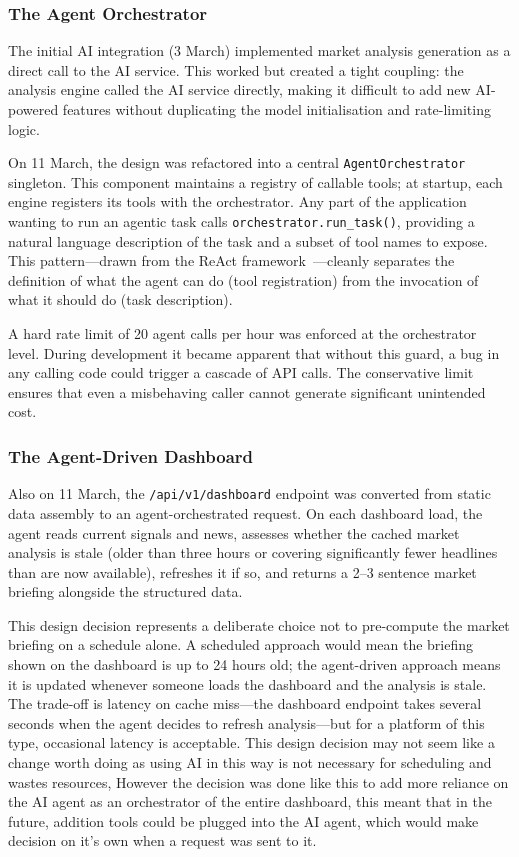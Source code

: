 \documentclass[12pt,a4paper]{article}
\begin{document}
\subsubsection*{The Agent Orchestrator}

The initial AI integration (3 March) implemented market analysis generation as a direct call to the AI service. This worked but created a tight coupling: the analysis engine called the AI service directly, making it difficult to add new AI-powered features without duplicating the model initialisation and rate-limiting logic.

On 11 March, the design was refactored into a central \texttt{AgentOrchestrator} singleton. This component maintains a registry of callable tools; at startup, each engine registers its tools with the orchestrator. Any part of the application wanting to run an agentic task calls \texttt{orchestrator.run\_task()}, providing a natural language description of the task and a subset of tool names to expose. This pattern---drawn from the ReAct framework~\cite{yao2022}---cleanly separates the definition of what the agent can do (tool registration) from the invocation of what it should do (task description).

A hard rate limit of 20 agent calls per hour was enforced at the orchestrator level. During development it became apparent that without this guard, a bug in any calling code could trigger a cascade of API calls. The conservative limit ensures that even a misbehaving caller cannot generate significant unintended cost.

\subsubsection*{The Agent-Driven Dashboard}

Also on 11 March, the \texttt{/api/v1/dashboard} endpoint was converted from static data assembly to an agent-orchestrated request. On each dashboard load, the agent reads current signals and news, assesses whether the cached market analysis is stale (older than three hours or covering significantly fewer headlines than are now available), refreshes it if so, and returns a 2--3 sentence market briefing alongside the structured data.

This design decision represents a deliberate choice not to pre-compute the market briefing on a schedule alone. A scheduled approach would mean the briefing shown on the dashboard is up to 24 hours old; the agent-driven approach means it is updated whenever someone loads the dashboard and the analysis is stale. The trade-off is latency on cache miss---the dashboard endpoint takes several seconds when the agent decides to refresh analysis---but for a platform of this type, occasional latency is acceptable. This design decision may not seem like a change worth doing as using AI in this way is not necessary for scheduling and wastes resources, However the decision was done like this to add more reliance on the AI agent as an orchestrator of the entire dashboard, this meant that in the future, addition tools could be plugged into the AI agent, which would make decision on it's own when a request was sent to it.
\end{document}
